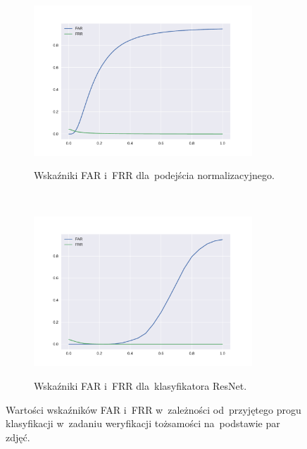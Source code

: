 \documentclass[11pt,a4paper]{article}
\begin{document}
\begin{figure}[H]
    \begin{subfigure}{\textwidth}
        \centering
        \includegraphics[width=0.9\textwidth]{res/img/normalized_error_rates.pdf}
        \label{subfig:normalized-error-rates}
        \caption{Wskaźniki FAR i~FRR dla~podejścia normalizacyjnego.}
    \end{subfigure}
    \\
    \begin{subfigure}{\textwidth}
        \centering
        \includegraphics[width=0.9\textwidth]{res/img/resnet_error_rates.pdf}
        \label{subfig:resnet-error-rates}
        \caption{Wskaźniki FAR i~FRR dla~klasyfikatora ResNet.}
    \end{subfigure}
    \caption{Wartości wskaźników FAR i~FRR w~zależności od~przyjętego progu klasyfikacji w~zadaniu weryfikacji tożsamości na~podstawie par zdjęć.}
    \label{fig:error-rates}
\end{figure}
\end{document}
